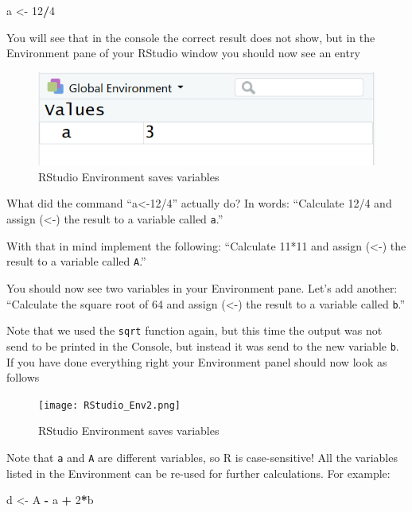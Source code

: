 \documentclass[
]{article}
\newenvironment{Shaded}{\begin{snugshade}}{\end{snugshade}}
\newcommand{\DecValTok}[1]{\textcolor[rgb]{0.00,0.00,0.81}{#1}}
\newcommand{\NormalTok}[1]{#1}
\newcommand{\OtherTok}[1]{\textcolor[rgb]{0.56,0.35,0.01}{#1}}
\newcommand{\SpecialCharTok}[1]{\textcolor[rgb]{0.81,0.36,0.00}{\textbf{#1}}}
\begin{document}
\begin{Shaded}
\begin{Highlighting}[]
\NormalTok{a }\OtherTok{\textless{}{-}} \DecValTok{12}\SpecialCharTok{/}\DecValTok{4}
\end{Highlighting}
\end{Shaded}

You will see that in the console the correct result does not show, but
in the Environment pane of your RStudio window you should now see an
entry

\begin{figure}
\centering
\includegraphics{images/RStudio_Env.png}
\caption{RStudio Environment saves variables}
\end{figure}

What did the command ``a\textless-12/4'' actually do? In words:
``Calculate 12/4 and assign (\textless-) the result to a variable called
\texttt{a}.''

With that in mind implement the following: ``Calculate 11*11 and assign
(\textless-) the result to a variable called \texttt{A}.''

You should now see two variables in your Environment pane. Let's add
another: ``Calculate the square root of 64 and assign (\textless-) the
result to a variable called \texttt{b}.''

Note that we used the \texttt{sqrt} function again, but this time the
output was not send to be printed in the Console, but instead it was
send to the new variable \texttt{b}. If you have done everything right
your Environment panel should now look as follows

\begin{figure}
\centering
\texttt{[image: RStudio\_Env2.png]}
\caption{RStudio Environment saves variables}
\end{figure}

Note that \texttt{a} and \texttt{A} are different variables, so R is
case-sensitive! All the variables listed in the Environment can be
re-used for further calculations. For example:

\begin{Shaded}
\begin{Highlighting}[]
\NormalTok{d }\OtherTok{\textless{}{-}}\NormalTok{ A }\SpecialCharTok{{-}}\NormalTok{ a }\SpecialCharTok{+} \DecValTok{2}\SpecialCharTok{*}\NormalTok{b}
\end{Highlighting}
\end{Shaded}
\end{document}
